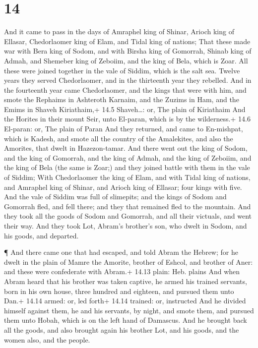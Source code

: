 \hypertarget{section-13}{%
\section{14}\label{section-13}}

 And it came to pass in the days of Amraphel king of Shinar,
Arioch king of Ellasar, Chedorlaomer king of Elam, and Tidal king of
nations;  That these made war with Bera king of Sodom, and
with Birsha king of Gomorrah, Shinab king of Admah, and Shemeber king of
Zeboiim, and the king of Bela, which is Zoar.  All these
were joined together in the vale of Siddim, which is the salt sea.
 Twelve years they served Chedorlaomer, and in the
thirteenth year they rebelled.  And in the fourteenth year
came Chedorlaomer, and the kings that were with him, and smote the
Rephaims in Ashteroth Karnaim, and the Zuzims in Ham, and the Emims in
Shaveh Kiriathaim,+ 14.5 Shaveh\ldots: or, The plain of Kiriathaim
 And the Horites in their mount Seir, unto El-paran, which
is by the wilderness.+ 14.6 El-paran: or, The plain of Paran
 And they returned, and came to En-mishpat, which is Kadesh,
and smote all the country of the Amalekites, and also the Amorites, that
dwelt in Hazezon-tamar.  And there went out the king of
Sodom, and the king of Gomorrah, and the king of Admah, and the king of
Zeboiim, and the king of Bela (the same is Zoar;) and they joined battle
with them in the vale of Siddim;  With Chedorlaomer the king
of Elam, and with Tidal king of nations, and Amraphel king of Shinar,
and Arioch king of Ellasar; four kings with five.  And the
vale of Siddim was full of slimepits; and the kings of Sodom and
Gomorrah fled, and fell there; and they that remained fled to the
mountain.  And they took all the goods of Sodom and
Gomorrah, and all their victuals, and went their way.  And
they took Lot, Abram's brother's son, who dwelt in Sodom, and his goods,
and departed.

 ¶ And there came one that had escaped, and told Abram the
Hebrew; for he dwelt in the plain of Mamre the Amorite, brother of
Eshcol, and brother of Aner: and these were confederate with Abram.+
14.13 plain: Heb. plains  And when Abram heard that his
brother was taken captive, he armed his trained servants, born in his
own house, three hundred and eighteen, and pursued them unto Dan.+ 14.14
armed: or, led forth+ 14.14 trained: or, instructed  And he
divided himself against them, he and his servants, by night, and smote
them, and pursued them unto Hobah, which is on the left hand of
Damascus.  And he brought back all the goods, and also
brought again his brother Lot, and his goods, and the women also, and
the people.

